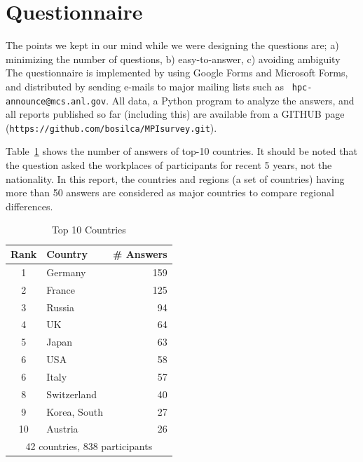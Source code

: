 \documentclass[sigconf,nonacm]{acmart}
\begin{document}
\section{Questionnaire}

The points we kept in our mind while we were designing the
questions are; a) minimizing the number of questions, b) easy-to-answer,
c) avoiding ambiguity
The questionnaire is implemented by using Google Forms and Microsoft
Forms, and distributed
by sending e-mails to major mailing lists such as {\tt
  hpc-announce@mcs.anl.gov}. 
All data, a Python program to analyze the answers, and all reports
published so far (including this) are available from a GITHUB page
({\tt https://github.com/bosilca/MPIsurvey.git}).  

Table~\ref{tab:countries} shows the number of answers of top-10
countries. It should be noted that the question asked the
workplaces of participants for recent 5 years, not the nationality.
In this report, the countries and regions (a set of countries)
having more than 50 answers are considered as major countries to
compare regional differences.

{\small
\begin{table}[htb]%
\begin{center}%
\caption{\small Top 10 Countries}\label{tab:countries}%
\begin{tabular}{c|l|r}%
\hline%
Rank & Country & \# Answers \hspace{5mm} \\%
\hline%
1 & Germany 	& 159 \hspace{8mm} \\%
2 & France 	& 125 \hspace{8mm} \\%
3 & Russia 	& 94 \hspace{8mm} \\%
4 & UK 		& 64 \hspace{8mm} \\%
5 & Japan 	& 63 \hspace{8mm} \\%
6 & USA 		& 58 \hspace{8mm} \\%
6 & Italy 		& 57 \hspace{8mm} \\%
\hline
8 & Switzerland & 40 \hspace{8mm} \\%
9 & Korea, South & 27 \hspace{8mm} \\%
10 & Austria 	& 26 \hspace{8mm} \\%
\hline%
\multicolumn{3}{c}{42 countries, 838 participants} \\%
\end{tabular}%
\end{center}%
\end{table}%
}
\end{document}

